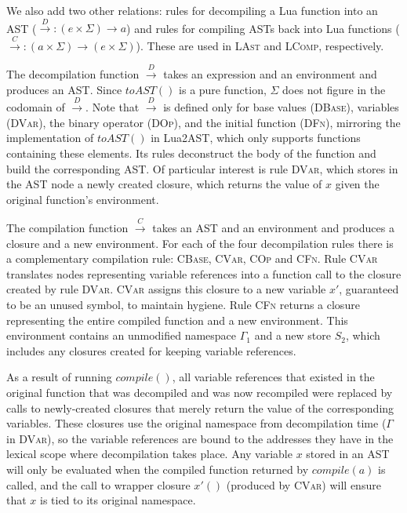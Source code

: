 \documentclass[english]{llncs}
\begin{document}
We also add two other relations: rules for decompiling a Lua function
into an AST ($\overset{D}{\rightarrow}:(e\times\Sigma)\rightarrow a$)
and rules for compiling ASTs back into Lua functions ($\overset{C}{\rightarrow}:(a\times\Sigma)\rightarrow(e\times\Sigma)$).
These are used in \textsc{LAst} and \textsc{LComp}, respectively.

The decompilation function $\overset{D}{\rightarrow}$ takes an expression
and an environment and produces an AST. Since $toAST()$ is a pure
function, $\Sigma$ does not figure in the codomain of $\overset{D}{\rightarrow}$.
Note that $\overset{D}{\rightarrow}$ is defined only for base values
(\textsc{DBase}), variables (\textsc{DVar}), the binary operator (\textsc{DOp}),
and the initial function (\textsc{DFn}), mirroring the implementation
of $toAST()$ in Lua2AST, which only supports functions containing
these elements. Its rules deconstruct the body of the function and
build the corresponding AST. Of particular interest is rule \textsc{DVar},
which stores in the AST node a newly created closure, which returns
the value of $x$ given the original function's environment.

The compilation function $\overset{C}{\rightarrow}$ takes an AST
and an environment and produces a closure and a new environment. For
each of the four decompilation rules there is a complementary compilation
rule: \textsc{CBase}, \textsc{CVar}, \textsc{COp} and \textsc{CFn}.
Rule \textsc{CVar} translates nodes representing variable references
into a function call to the closure created by rule \textsc{DVar}.
\textsc{CVar} assigns this closure to a new variable $x'$, guaranteed
to be an unused symbol, to maintain hygiene. Rule \textsc{CFn} returns
a closure representing the entire compiled function and a new environment.
This environment contains an unmodified namespace $\Gamma_{1}$ and
a new store $S_{2}$, which includes any closures created for keeping
variable references.

As a result of running $compile()$, all variable references that
existed in the original function that was decompiled and was now recompiled
were replaced by calls to newly-created closures that merely return
the value of the corresponding variables. These closures use the original
namespace from decompilation time ($\Gamma$ in \textsc{DVar}), so
the variable references are bound to the addresses they have in the
lexical scope where decompilation takes place. Any variable $x$ stored
in an AST will only be evaluated when the compiled function returned
by $compile(a)$ is called, and the call to wrapper closure $x'()$
(produced by \textsc{CVar}) will ensure that $x$ is tied to its original
namespace.
\end{document}
